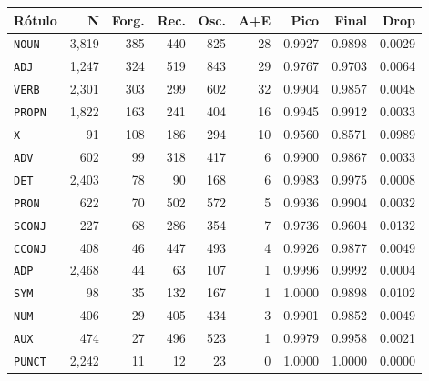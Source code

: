 \begin{table}[ht]
\hfill
\begin{minipage}[t]{0.42\linewidth}
\centering\tiny
\begin{tabular}{lrrrrrrrr}
\toprule
\textbf{Rótulo} & \textbf{N} & \textbf{Forg.} & \textbf{Rec.} & \textbf{Osc.} & \textbf{A+E} & \textbf{Pico} & \textbf{Final} & \textbf{Drop} \\
\midrule
\texttt{NOUN} & 3,819 & 385 & 440 & 825 & 28 & 0.9927 & 0.9898 & 0.0029 \\
\texttt{ADJ} & 1,247 & 324 & 519 & 843 & 29 & 0.9767 & 0.9703 & 0.0064 \\
\texttt{VERB} & 2,301 & 303 & 299 & 602 & 32 & 0.9904 & 0.9857 & 0.0048 \\
\texttt{PROPN} & 1,822 & 163 & 241 & 404 & 16 & 0.9945 & 0.9912 & 0.0033 \\
\texttt{X} & 91 & 108 & 186 & 294 & 10 & 0.9560 & 0.8571 & 0.0989 \\
\texttt{ADV} & 602 & 99 & 318 & 417 & 6 & 0.9900 & 0.9867 & 0.0033 \\
\texttt{DET} & 2,403 & 78 & 90 & 168 & 6 & 0.9983 & 0.9975 & 0.0008 \\
\texttt{PRON} & 622 & 70 & 502 & 572 & 5 & 0.9936 & 0.9904 & 0.0032 \\
\texttt{SCONJ} & 227 & 68 & 286 & 354 & 7 & 0.9736 & 0.9604 & 0.0132 \\
\texttt{CCONJ} & 408 & 46 & 447 & 493 & 4 & 0.9926 & 0.9877 & 0.0049 \\
\texttt{ADP} & 2,468 & 44 & 63 & 107 & 1 & 0.9996 & 0.9992 & 0.0004 \\
\texttt{SYM} & 98 & 35 & 132 & 167 & 1 & 1.0000 & 0.9898 & 0.0102 \\
\texttt{NUM} & 406 & 29 & 405 & 434 & 3 & 0.9901 & 0.9852 & 0.0049 \\
\texttt{AUX} & 474 & 27 & 496 & 523 & 1 & 0.9979 & 0.9958 & 0.0021 \\
\texttt{PUNCT} & 2,242 & 11 & 12 & 23 & 0 & 1.0000 & 1.0000 & 0.0000 \\
\bottomrule
\end{tabular}
\end{minipage}
\end{table}


